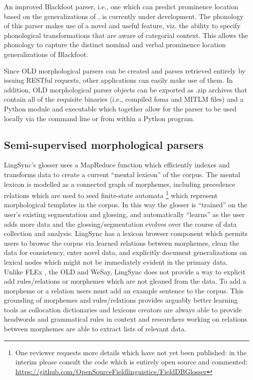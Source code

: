 \documentclass[11pt]{article}
\begin{document}
An improved Blackfoot parser, i.e., one which can predict prominence location
based on the generalizations of \cite{weber2013}, is currently under
development. The phonology of this parser makes use of a novel and useful
feature, viz. the ability to specify phonological transformations that are
aware of categorial context. This allows the phonology to capture the distinct
nominal and verbal prominence location generalizations of Blackfoot.

Since OLD morphological parsers can be created and parses retrieved entirely by
issuing RESTful requests, other applications can easily make use of them. In
addition, OLD morphological parser objects can be exported as .zip archives
that contain all of the requisite binaries (i.e., compiled foma and MITLM
files) and a Python module and executable which together allow for the parser
to be used locally via the command line or from within a Python program.



\subsection{Semi-supervised morphological parsers}
 \label{sec:lingsync-glosser} 

LingSync's glosser uses a MapReduce function which efficiently indexes and transforms data 
 to create a current ``mental lexicon'' of the corpus.  The
mental lexicon is modelled as a connected graph of morphemes, including
precedence relations which are used to seed finite-state automata \cite{Cook:2009}%
\footnote{One reviewer requests more details which have not yet been published: in the interim please consult the  code which is entirely open source and commented:  \\
\url{https://github.com/OpenSourceFieldlinguistics/FieldDBGlosser}}
which represent morphological templates in the corpus. In this way the glosser
is ``trained'' on the user's existing segmentation and glossing, and
automatically ``learns'' as the user adds more data and the
glossing/segmentation evolves over the course of data collection and analysis. 
LingSync has a lexicon browser component which permits users to browse the
corpus via learned  relations between morphemes, clean the data for
consistency, enter novel data, and explicitly document generalizations on
lexical nodes which might not be immediately evident in the primary data.
Unlike FLEx \cite{Black:2006}, the OLD and WeSay, LingSync does not provide
a way to explicit add rules/relations or morphemes which are not gleaned from
the data. To add a morpheme or a relation users must add an example sentence to
the corpus. This grounding of morphemes and rules/relations
provides arguably better learning tools as collocation dictionaries and
lexicons creators are always able to provide headwords and grammatical rules in
context and researchers working on relations between morphemes are able to extract lists of relevant data.
\end{document}
